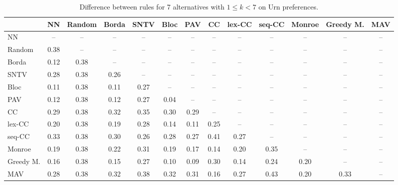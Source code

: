 
\begin{table*}[h!]
\centering
\begin{tabular}{lcccccccccccc}
\toprule
 & NN & Random & Borda & SNTV & Bloc & PAV & CC & lex-CC & seq-CC & Monroe & Greedy M. & MAV \\
\midrule
NN & -- & -- & -- & -- & -- & -- & -- & -- & -- & -- & -- & -- \\
Random & 0.38 & -- & -- & -- & -- & -- & -- & -- & -- & -- & -- & -- \\
Borda & 0.12 & 0.38 & -- & -- & -- & -- & -- & -- & -- & -- & -- & -- \\
SNTV & 0.28 & 0.38 & 0.26 & -- & -- & -- & -- & -- & -- & -- & -- & -- \\
Bloc & 0.11 & 0.38 & 0.11 & 0.27 & -- & -- & -- & -- & -- & -- & -- & -- \\
PAV & 0.12 & 0.38 & 0.12 & 0.27 & 0.04 & -- & -- & -- & -- & -- & -- & -- \\
CC & 0.29 & 0.38 & 0.32 & 0.35 & 0.30 & 0.29 & -- & -- & -- & -- & -- & -- \\
lex-CC & 0.20 & 0.38 & 0.19 & 0.28 & 0.14 & 0.11 & 0.25 & -- & -- & -- & -- & -- \\
seq-CC & 0.33 & 0.38 & 0.30 & 0.26 & 0.28 & 0.27 & 0.41 & 0.27 & -- & -- & -- & -- \\
Monroe & 0.19 & 0.38 & 0.22 & 0.31 & 0.19 & 0.17 & 0.14 & 0.20 & 0.35 & -- & -- & -- \\
Greedy M. & 0.16 & 0.38 & 0.15 & 0.27 & 0.10 & 0.09 & 0.30 & 0.14 & 0.24 & 0.20 & -- & -- \\
MAV & 0.28 & 0.38 & 0.32 & 0.38 & 0.32 & 0.31 & 0.16 & 0.27 & 0.43 & 0.20 & 0.33 & -- \\
\bottomrule
\end{tabular}

\caption{Difference between rules for 7 alternatives with $1 \leq k < 7$ on Urn preferences.}
\end{table*}
